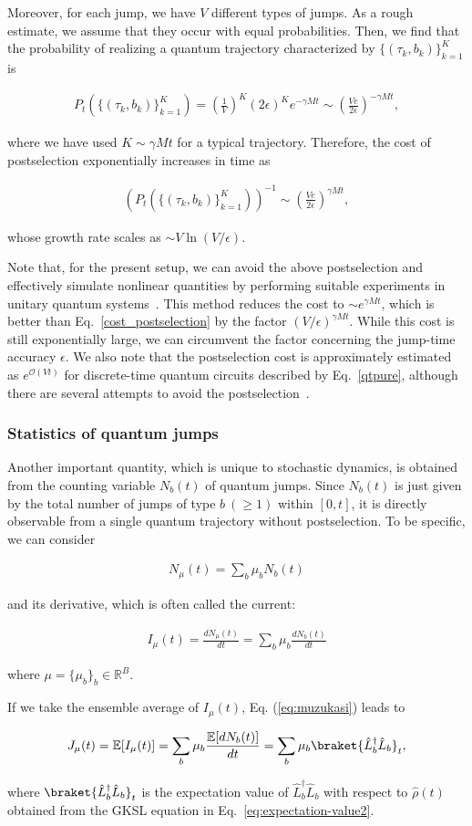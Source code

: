 \documentclass[preprint,pteplogo]{ptephy_v2}%
\numberwithin{equation}{section}
\theoremstyle{definition}
\newcommand{\ml}[1]{\mathcal{#1}}
\newcommand{\mbb}[1]{\mathbb{#1}}
\newcommand{\lrs}[1]{\left( #1 \right)}
\newcommand{\aln}[1]{
\begin{align}
#1
\end{align}
}
\begin{document}
Moreover, for each jump, we have $V$ different types of jumps. As a rough estimate, we assume that they occur with equal probabilities.
Then, we find that the probability of realizing a quantum trajectory characterized by $\{(\tau_k,b_k)\}_{k=1}^K$ is 
\aln{
P_t(\{(\tau_k,b_k)\}_{k=1}^K)=\lrs{\frac{1}{V}}^K(2\epsilon)^Ke^{-\gamma Mt}\sim \lrs{\frac{V e}{2\epsilon}}^{-\gamma Mt},
}
where we have used $K\sim \gamma M t$ for a typical trajectory.
Therefore, the cost of postselection exponentially increases in time as
\aln{\label{cost_postselection}
\lrs{P_t(\{(\tau_k,b_k)\}_{k=1}^K)}^{-1}\sim  \lrs{\frac{V e}{2\epsilon}}^{\gamma Mt},
}
whose growth rate scales as $\sim V\ln (V/\epsilon)$.

Note that, for the present setup, we can avoid the above postselection and effectively simulate nonlinear quantities by performing suitable experiments in unitary quantum systems~\cite{yamamoto2023localization}. 
This method reduces the cost to $\sim e^{\gamma Mt}$, which is better than Eq.~\eqref{cost_postselection} by the factor $(V/\epsilon)^{\gamma Mt}$.
While this cost is still exponentially large, we can circumvent the factor concerning the jump-time accuracy $\epsilon$.
We also note that the postselection cost is approximately estimated as $e^{\ml{O}(Vt)}$ for discrete-time quantum circuits described by Eq.~\eqref{qtpure}, although there are several attempts to avoid the postselection~\cite{Gullans20PRL, Hoke23, Agrawal24, Kamakari24, Barratt22, Dehghani23, Garratt23, Garratt24, Yamamoto25, Iadecola22, Buchhold22}.


\subsubsection{Statistics of quantum jumps}
Another important quantity, which is unique to stochastic dynamics, is obtained from the counting variable $N_b(t)$ of quantum jumps.
Since $N_b(t)$ is just given by the total number of jumps of type $b\:(\geq 1)$ within $[0,t]$, it is directly observable from a single quantum trajectory without postselection.
To be specific, we can consider~\cite{landi2024current}
\aln{
N_\mu(t)=\sum_b\mu_b N_b(t)
}
and its derivative, which is often called the current:
\aln{
I_\mu(t)=\frac{dN_\mu(t)}{dt}=\sum_b\mu_b \frac{dN_b(t)}{dt}
}
where $\mu=\{\mu_b\}_{b}\in\mbb{R}^B$.

If we take the ensemble average of $I_\mu(t)$, Eq. (\ref{eq:muzukasi}) leads to
\aln{\label{aveInu}
J_\mu(t)=\mbb{E}[I_\mu(t)]=\sum_b\mu_b\frac{\mbb{E}[dN_b(t)]}{dt}=\sum_b\mu_b\braket{\hat{L}_b^\dag\hat{L}_b}_t,
}
where $\braket{\hat{L}_b^\dag\hat{L}_b}_t$ is the expectation value of $\hat{L}_b^\dag\hat{L}_b$ with respect to $\hat{\rho}(t)$ obtained from the GKSL equation in Eq.~\eqref{eq:expectation-value2}.
\end{document}
